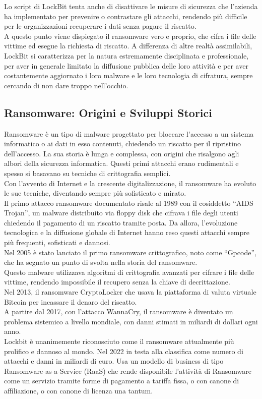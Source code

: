 \documentclass[a4paper,12pt,twoside]{article}
\begin{document}
Lo script di LockBit tenta anche di disattivare le misure di sicurezza che l'azienda ha implementato per prevenire o contrastare gli  attacchi, rendendo più difficile per le organizzazioni recuperare i dati senza pagare il riscatto. \\
A questo punto viene dispiegato il ransomware vero e proprio, che cifra i file delle vittime ed esegue la richiesta di riscatto. A differenza di altre realtà assimilabili, LockBit si caratterizza per la natura estremamente disciplinata e professionale, per aver in generale limitato la diffusione pubblica delle loro attività e per aver costantemente aggiornato i loro malware e le loro tecnologia di cifratura, sempre cercando di non dare troppo nell'occhio.


\subsection{Ransomware: Origini e Sviluppi Storici}
Ransomware è un tipo di malware progettato per bloccare l'accesso a un sistema informatico o ai dati in esso contenuti, chiedendo un riscatto per il ripristino dell'accesso. La sua storia è lunga e complessa, con origini che risalgono agli albori della sicurezza informatica. Questi primi attacchi erano rudimentali e spesso si basavano su tecniche di crittografia semplici.\\
Con l'avvento di Internet e la crescente digitalizzazione, il ransomware ha evoluto le sue tecniche, diventando sempre più sofisticato e mirato.\\
Il primo attacco ransomware documentato risale al 1989 con il cosiddetto “AIDS Trojan”, un malware distribuito via floppy disk che cifrava i file degli utenti chiedendo il pagamento di un riscatto tramite posta. Da allora, l'evoluzione tecnologica e la diffusione globale di Internet hanno reso questi attacchi sempre più frequenti, sofisticati e dannosi.\\
Nel 2005 è stato lanciato il primo ransomware crittografico, noto come “Gpcode”, che ha segnato un punto di svolta nella storia del ransomware. \\
Questo malware utilizzava algoritmi di crittografia avanzati per cifrare i file delle vittime, rendendo impossibile il recupero senza la chiave di decrittazione.\\
Nel 2013, il ransomware CryptoLocker che usava la piattaforma di valuta virtuale Bitcoin per incassare il denaro del riscatto.\\
A partire dal 2017, con l'attacco WannaCry, il ransomware è diventato un problema sistemico a livello mondiale, con danni stimati in miliardi di dollari ogni anno.\\
Lockbit è unanimemente riconosciuto come il ransomware attualmente più prolifico e dannoso al mondo. Nel 2022 in testa alla classifica come numero di attacchi e danni in miliardi di euro. Usa un modello di business di tipo Ransomware-as-a-Service (RaaS) che rende disponibile l'attività di Ransomware come un servizio tramite forme di pagamento a tariffa fissa, o con canone di affiliazione, o con canone di licenza una tantum.
\end{document}
